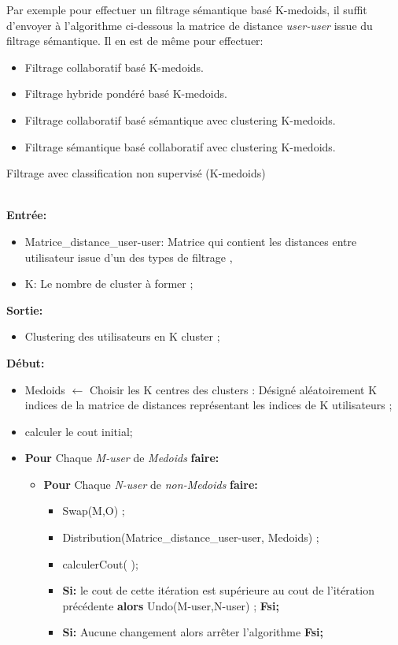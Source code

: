 Par exemple pour effectuer un filtrage sémantique basé K-medoids, il suffit d'envoyer à l'algorithme ci-dessous la matrice de distance \textit{user-user} issue du filtrage sémantique.
Il en est de même pour effectuer:
\begin{itemize}
	\item Filtrage collaboratif basé K-medoids.
	\item Filtrage hybride pondéré basé K-medoids.
	\item Filtrage collaboratif basé sémantique avec clustering K-medoids.
	\item Filtrage sémantique basé collaboratif avec clustering K-medoids.
\end{itemize}


\begin{algorithm}[H]
	\caption{Filtrage avec classification non supervisé  (K-medoids)}
	\hspace*{\algorithmicindent} \\
	\hspace*{\algorithmicindent} \textbf{Entrée:}
		\begin{itemize}
		\item [] Matrice{\_}distance{\_}user-user: Matrice qui contient les distances entre utilisateur issue d'un des types de filtrage , 
		\item [] K: Le nombre de cluster à former ;
		\end{itemize}
		\hspace*{\algorithmicindent} \textbf{Sortie:} 
	\begin{itemize}
		\item [] Clustering des utilisateurs en K cluster ;
	\end{itemize}
	\hspace*{\algorithmicindent}\textbf{ Début:}	
		
		\begin{itemize}
		\item  [] Medoids $\leftarrow$ Choisir les K centres  des clusters : Désigné aléatoirement K indices de la matrice de distances représentant les indices de K utilisateurs ;
		\item [] calculer le cout initial;	

		\item [] \textbf{Pour} Chaque \textit{M-user } de \textit{Medoids} \textbf{faire:}
		\begin{itemize}
			\item [] \textbf{Pour} Chaque \textit{N-user}  de \textit{non-Medoids} \textbf{faire:}
			\begin{itemize}
				\item [] Swap(M,O) ;
				\item [] Distribution(Matrice{\_}distance{\_}user-user, Medoids) ;
				\item [] calculerCout( );
				\item []  \textbf{Si:} le cout de cette itération est supérieure au cout de l'itération précédente \textbf{alors} Undo(M-user,N-user) ; \textbf{Fsi;}	
				\item []  \textbf{Si:} Aucune changement alors arrêter l'algorithme \textbf{Fsi;}			
				

\end{itemize}
\end{itemize}
\end{itemize}
\end{algorithm}
